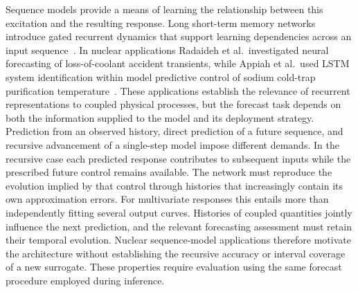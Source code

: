 Sequence models provide a means of learning the relationship between this excitation and the resulting response. Long short-term memory networks introduce gated recurrent dynamics that support learning dependencies across an input sequence~\cite{hochreiter1997lstm}. In nuclear applications Radaideh et al.\ investigated neural forecasting of loss-of-coolant accident transients, while Appiah et al.\ used LSTM system identification within model predictive control of sodium cold-trap purification temperature~\cite{radaideh2020loca,appiah2024coldtrap}. These applications establish the relevance of recurrent representations to coupled physical processes, but the forecast task depends on both the information supplied to the model and its deployment strategy. Prediction from an observed history, direct prediction of a future sequence, and recursive advancement of a single-step model impose different demands. In the recursive case each predicted response contributes to subsequent inputs while the prescribed future control remains available. The network must reproduce the evolution implied by that control through histories that increasingly contain its own approximation errors. For multivariate responses this entails more than independently fitting several output curves. Histories of coupled quantities jointly influence the next prediction, and the relevant forecasting assessment must retain their temporal evolution. Nuclear sequence-model applications therefore motivate the architecture without establishing the recursive accuracy or interval coverage of a new surrogate. These properties require evaluation using the same forecast procedure employed during inference.

